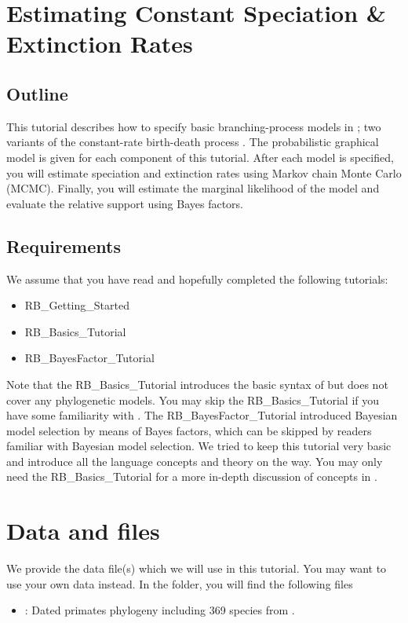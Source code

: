 \section{Estimating Constant Speciation \& Extinction Rates}

\subsection{Outline}

This tutorial describes how to specify basic branching-process models in \RevBayes;
two variants of the constant-rate birth-death process \citep{Yule1925,Kendall1948,Thompson1975,Nee1994b,Rannala1996,Yang1997,Hoehna2015a}.
The probabilistic graphical model is given for each component of this tutorial.
After each model is specified, you will estimate speciation and extinction rates using Markov chain Monte Carlo (MCMC).
Finally, you will estimate the marginal likelihood of the model and evaluate the relative support using Bayes factors.

\subsection{Requirements}
We assume that you have read and hopefully completed the following tutorials:
\begin{itemize}
\item RB\_Getting\_Started
\item RB\_Basics\_Tutorial
\item RB\_BayesFactor\_Tutorial
\end{itemize}
Note that the RB\_Basics\_Tutorial introduces the basic syntax of \Rev but does not cover any phylogenetic models.
You may skip the RB\_Basics\_Tutorial if you have some familiarity with \R.
The RB\_BayesFactor\_Tutorial introduced Bayesian model selection by means of Bayes factors, which can be skipped by readers familiar with Bayesian model selection.
We tried to keep this tutorial very basic and introduce all the language concepts and theory on the way.
You may only need the RB\_Basics\_Tutorial for a more in-depth discussion of concepts in \Rev.


\section{Data and files}

We provide the data file(s) which we will use in this tutorial.
You may want to use your own data instead.
In the  folder, you will find the following files
\begin{itemize}
\item {}: Dated primates phylogeny including 369 species from \cite{Springer2012}.
\end{itemize}


